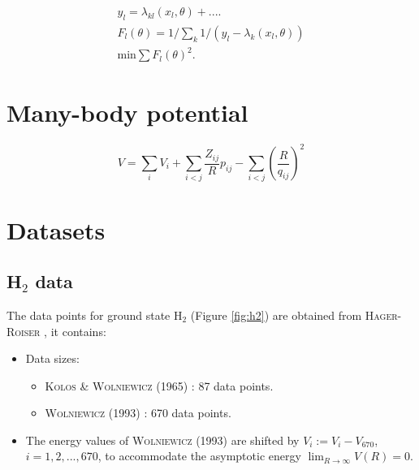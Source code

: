 \documentclass[12pt]{article}
\begin{document}
\begin{equation}
    \begin{split}
        y_l = \lambda_{kl}(x_l, \theta) + .... \\
        F_l(\theta) = 1/\sum_k 1/(y_l - \lambda_k(x_l, \theta)) \\
        \text{min} \sum F_l(\theta)^2.
    \end{split}
\end{equation}

\section{Many-body potential}
\begin{equation}
    V = \sum_i V_i + \sum_{i<j}\frac{Z_{ij}}{R}p_{ij} - \sum_{i<j}(\frac{R}{q_{ij}})^2
\end{equation}


\section{Datasets}
\subsection{H$_2$ data}
The data points for ground state H$_2$ (Figure \ref{fig:h2}) are obtained from \textsc{Hager-Roiser} \cite{ulrik}, it contains:
\begin{itemize}
    \item Data sizes:
    \begin{itemize}
        \item \textsc{Kolos \& Wolniewicz} (1965) \cite{idx166}: 87 data points.
        \item \textsc{Wolniewicz} (1993) \cite{idx167}: 670 data points.
    \end{itemize}
    \item The energy values of \textsc{Wolniewicz} (1993) are shifted by $V_i := V_i-V_{670}$, $i=1,2,...,670$, to accommodate the asymptotic energy $\lim_{R \to \infty} V(R) = 0$.
\end{itemize}
\end{document}
